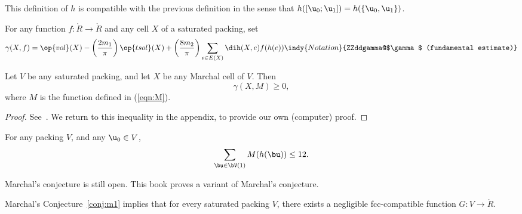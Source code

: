 This definition of $h$ is compatible with the previous definition in the sense that
$h([\u_0;\u_1]) = h(\{\u_0,\u_1\})$.

\begin{definition}[$\gamma$] 
For any function $f:\ring{R}\to\ring{R}$ and any cell $X$ of a saturated packing, set
\begin{equation}\label{eqn:gamma-def} 
\gamma(X,f) =  \op{vol}(X)
-\left(\frac{2m_1}{\pi}\right) \op{tsol}(X) + \left(\frac{8m_2}{\pi}\right)
\sum_{e\in E(X)} \dih(X,e)  f(h(e))
\indy{Notation}{ZZddgamma@$\gamma$ (fundamental estimate)}%
\end{equation}
\end{definition}


\begin{theorem}\label{lemma:MI} 
Let $V$ be any saturated packing, and let $X$ be any Marchal cell of $V$.  Then
\begin{equation}\label{eqn:mfe} 
\gamma(X,M)\ge 0,
\end{equation}
where $M$ is the function defined in (\ref{eqn:M}).
\end{theorem}

\begin{proof}  See~\cite{marchal:2008}.  We return to this inequality in the appendix,
to provide our own (computer) proof.
\end{proof}


\begin{conjecture}[Marchal]\label{conj:m1} 
For any packing $ V$, and
any $ \u_0\in V$,
\begin{displaymath} 
\sum_{\bu\in \bV(1)} M(h(\bu)) \le 12.
\end{displaymath}
\end{conjecture}

Marchal's conjecture is still open.  This book proves a variant of
Marchal's conjecture.

\begin{theorem}\label{theorem:mk1} 
Marchal's Conjecture~\ref{conj:m1} implies
that for every saturated packing $V$, there exists a negligible fcc-compatible function
$G:V\to \ring{R}$.
\end{theorem}


